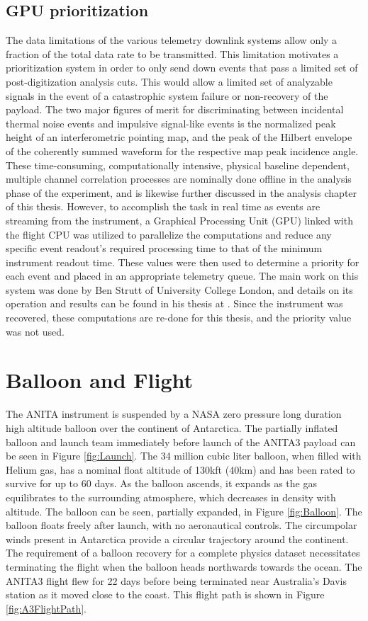 	\subsection{GPU prioritization}
		The data limitations of the various telemetry downlink systems allow only a fraction of the total data rate to be transmitted.  This limitation motivates a prioritization system in order to only send down events that pass a limited set of post-digitization analysis cuts.  This would allow a limited set of analyzable signals in the event of a catastrophic system failure or non-recovery of the payload.  The two major figures of merit for discriminating between incidental thermal noise events and impulsive signal-like events is the normalized peak height of an interferometric pointing map, and the peak of the Hilbert envelope of the coherently summed waveform for the respective map peak incidence angle.  These time-consuming, computationally intensive, physical baseline dependent, multiple channel correlation processes are nominally done offline in the analysis phase of the experiment, and is likewise further discussed in the analysis chapter of this thesis.  However, to accomplish the task in real time as events are streaming from the instrument, a Graphical Processing Unit (GPU) linked with the flight CPU was utilized to parallelize the computations and reduce any specific event readout's required processing time to that of the minimum instrument readout time.  These values were then used to determine a priority for each event and placed in an appropriate telemetry queue.  The main work on this system was done by Ben Strutt of University College London, and details on its operation and results can be found in his thesis at \cite{BenSThesis}.  Since the instrument was recovered, these computations are re-done for this thesis, and the priority value was not used.
		
\section{Balloon and Flight}
		The ANITA instrument is suspended by a NASA zero pressure long duration high altitude balloon over the continent of Antarctica.  The partially inflated balloon and launch team immediately before launch of the ANITA3 payload can be seen in Figure \ref{fig:Launch}.  The 34 million cubic liter balloon, when filled with Helium gas, has a nominal float altitude of 130kft (40km) and has been rated to survive for up to 60 days.  As the balloon ascends, it expands as the gas equilibrates to the surrounding atmosphere, which decreases in density with altitude. The balloon can be seen, partially expanded, in Figure \ref{fig:Balloon}.  The balloon floats freely after launch, with no aeronautical controls. The circumpolar winds present in Antarctica provide a circular trajectory around the continent.  The requirement of a balloon recovery for a complete physics dataset necessitates terminating the flight when the balloon heads northwards towards the ocean.  The ANITA3 flight flew for 22 days before being terminated near Australia's Davis station as it moved close to the coast.  This flight path is shown in Figure \ref{fig:A3FlightPath}.

